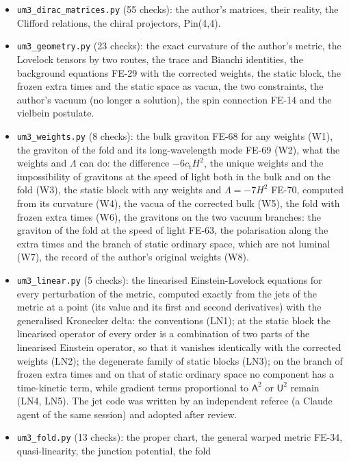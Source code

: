 \documentclass[
  10pt,
]{article}
\providecommand{\tightlist}{%
  \setlength{\itemsep}{0pt}\setlength{\parskip}{0pt}}
\begin{document}
\begin{itemize}
\tightlist
\item
  \texttt{um3\_dirac\_matrices.py} (55 checks): the author's matrices,
  their reality, the Clifford relations, the chiral projectors,
  Pin(4,4).
\item
  \texttt{um3\_geometry.py} (23 checks): the exact curvature of the
  author's metric, the Lovelock tensors by two routes, the trace and
  Bianchi identities, the background equations FE-29 with the corrected
  weights, the static block, the frozen extra times and the static space
  as vacua, the two constraints, the author's vacuum (no longer a
  solution), the spin connection FE-14 and the vielbein postulate.
\item
  \texttt{um3\_weights.py} (8 checks): the bulk graviton FE-68 for any
  weights (W1), the graviton of the fold and its long-wavelength mode
  FE-69 (W2), what the weights and \(\Lambda\) can do: the difference
  \(-6c_{\mathrm{t}}H^2\), the unique weights and the impossibility of
  gravitons at the speed of light both in the bulk and on the fold (W3),
  the static block with any weights and \(\Lambda = -7H^2\) FE-70,
  computed from its curvature (W4), the vacua of the corrected bulk
  (W5), the fold with frozen extra times (W6), the gravitons on the two
  vacuum branches: the graviton of the fold at the speed of light FE-63,
  the polarisation along the extra times and the branch of static
  ordinary space, which are not luminal (W7), the record of the author's
  original weights (W8).
\item
  \texttt{um3\_linear.py} (5 checks): the linearised Einstein-Lovelock
  equations for every perturbation of the metric, computed exactly from
  the jets of the metric at a point (its value and its first and second
  derivatives) with the generalised Kronecker delta: the conventions
  (LN1); at the static block the linearised operator of every order is a
  combination of two parts of the linearised Einstein operator, so that
  it vanishes identically with the corrected weights (LN2); the
  degenerate family of static blocks (LN3); on the branch of frozen
  extra times and on that of static ordinary space no component has a
  time-kinetic term, while gradient terms proportional to
  \(\mathsf{A}^2\) or \(\mathsf{U}^2\) remain (LN4, LN5). The jet code
  was written by an independent referee (a Claude agent of the same
  session) and adopted after review.
\item
  \texttt{um3\_fold.py} (13 checks): the proper chart, the general
  warped metric FE-34, quasi-linearity, the junction potential, the fold

\end{itemize}
\end{document}
